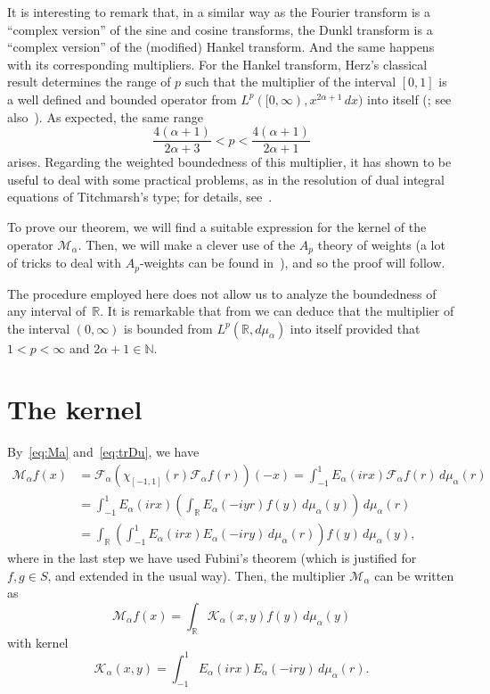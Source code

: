 \documentclass[a4paper]{amsart}
\theoremstyle{plain}
\theoremstyle{remark}
\newcommand{\R}{\mathbb{R}}
\newcommand{\N}{\mathbb{N}}
\newcommand{\Fa}{\mathcal{F}_\alpha} %
\newcommand{\Ma}{\mathcal{M}_\alpha} %
\newcommand{\Ka}{\mathcal{K}_\alpha} %
\newcommand{\mua}{\mu_\alpha}
\begin{document}
It is interesting to remark that,
in a similar way as the Fourier transform is a ``complex version'' of the sine and cosine transforms, the Dunkl transform is a ``complex version'' of the (modified) Hankel transform.
And the same happens with its corresponding multipliers.
For the Hankel transform, Herz's classical result determines the range of $p$ such that the multiplier of the interval $[0,1]$ is a well defined and bounded operator from $L^p([0,\infty), x^{2\alpha+1} \, dx)$ into itself (\cite{Her}; see also~\cite{Ste, Var}). As expected, the same range
$$
  \frac{4(\alpha+1)}{2\alpha+3} < p < \frac{4(\alpha+1)}{2\alpha+1}
$$
arises. Regarding the weighted boundedness of this multiplier, it has shown to be useful to deal with some practical problems, as in the resolution of dual integral equations of Titchmarsh's type; for details, see~\cite{CGPV-DIE}.

To prove our theorem, we will find a suitable expression for the kernel of the operator $\Ma$. Then, we will make a clever use of the $A_p$ theory of weights (a lot of tricks to deal with $A_p$-weights can be found in~\cite{Per}), and so the proof will follow.

The procedure employed here does not allow us to analyze the boundedness of any interval of~$\R$. It is remarkable that from \cite[Theorem 5.5]{ThX} we can deduce that the multiplier of the interval $(0,\infty)$ is bounded from $L^p(\R,d\mua)$ into itself provided that $1<p<\infty$ and $2\alpha+1 \in \N$.

\section{The kernel}

By~\eqref{eq:Ma} and~\eqref{eq:trDu}, we have
\begin{align*}
  \Ma f(x) &= \Fa(\chi_{[-1,1]}(r) \Fa f(r))(-x)
  = \int_{-1}^1 E_\alpha(irx) \Fa f(r)\,d\mua(r) \\
  &= \int_{-1}^1 E_\alpha(irx)
    \left( \int_\R E_\alpha(-iyr) f(y) \,d\mua(y) \right) \,d\mua(r) \\
  &= \int_{\R} \left( \int_{-1}^1 E_\alpha(irx) E_\alpha(-iry)\,d\mua(r) \right)
    f(y) \,d\mua(y),
\end{align*}
where in the last step we have used Fubini's theorem (which is justified for $f, g \in S$, and extended in the usual way). Then, the multiplier $\Ma$ can be written as
\begin{equation}
\label{eq:MaKa}
  \Ma f(x) = \int_{\R} \Ka(x,y) f(y) \,d\mua(y)
\end{equation}
with kernel
\begin{equation}
\label{eq:Kaint}
  \Ka(x,y) = \int_{-1}^1 E_\alpha(irx) E_\alpha(-iry)\,d\mua(r).
\end{equation}
\end{document}
